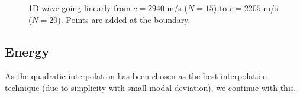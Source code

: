 \documentclass[dvipsnames]{article}
\begin{document}
\begin{figure}[h]
    \centering
    \hspace{0.05\textwidth}
    \caption{1D wave going linearly from $c = 2940$ m/s ($N=15$) to $c =2205$ m/s ($N=20$). Points are added at the boundary.}\label{fig:addAtBoundary}
\end{figure}

\subsection{Energy}
As the quadratic interpolation has been chosen as the best interpolation technique (due to simplicity with small modal deviation), we continue with this.
\end{document}
